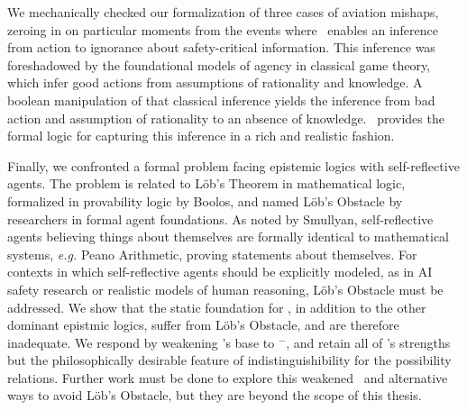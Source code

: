 We mechanically checked our formalization of three cases of aviation mishaps, zeroing in on particular moments from the events where \DASL\ enables an inference from action to ignorance about safety-critical information. This inference was foreshadowed by the foundational models of agency in classical game theory, which infer good actions from assumptions of rationality and knowledge. A boolean manipulation of that classical inference yields the inference from bad action and assumption of rationality to an absence of knowledge. \DASL\ provides the formal logic for capturing this inference in a rich and realistic fashion.

Finally, we confronted a formal problem facing epistemic logics with self-reflective agents. The problem is related to L\"ob's Theorem in mathematical logic, formalized in provability logic by Boolos, and named L\"ob's Obstacle by researchers in formal agent foundations. As noted by Smullyan, self-reflective agents believing things about themselves are formally identical to mathematical systems, \emph{e.g.} Peano Arithmetic, proving statements about themselves. For contexts in which self-reflective agents should be explicitly modeled, as in AI safety research or realistic models of human reasoning, L\"ob's Obstacle must be addressed. We show that the static foundation for \DASL, in addition to the other dominant epistmic logics, suffer from L\"ob's Obstacle, and are therefore inadequate. We respond by weakening \DASL's base to \DASL$^-$, and retain all of \DASL's strengths but the philosophically desirable feature of indistinguishibility for the possibility relations. Further work must be done to explore this weakened \DASL\ and alternative ways to avoid L\"ob's Obstacle, but they are beyond the scope of this thesis. 